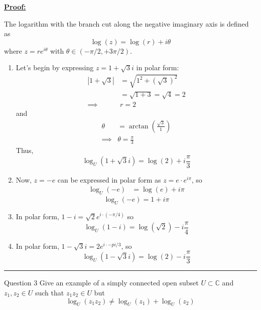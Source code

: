 \documentclass{article}
\newcommand{\C}{\mathbb{C}}
\begin{document}
\vskip 0.5cm
\underline{\textbf{Proof:}}

The logarithm with the branch cut along the negative imaginary axis is defined as \[ \log(z) = \log(r) + i\theta \] where $z = re^{i\theta}$ with $\theta \in \left(-\pi/2, +3\pi/2\right)$.

\vskip 0.5cm
\begin{enumerate}[label=(\alph*)]
  \item Let's begin by expressing $z = 1 + \sqrt{3}i$ in polar form:
  \begin{align*}
    |1 + \sqrt{3}| &= \sqrt{1^2 + \left(\sqrt{3}\right)^2} \\
    &= \sqrt{1 + 3} = \sqrt{4} = 2 \\
    \implies& r = 2
  \end{align*}
  and 
  \begin{align*}
    \theta &= \arctan\left(\frac{\sqrt{3}}{1}\right) \\
    \implies& \theta = \frac{\pi}{3}
  \end{align*}
  Thus,
  \[ \boxed{ \log_U\left(1 + \sqrt{3}i\right) = \log(2) + i\frac{\pi}{3}} \]

  \vskip 0.5cm
  \item Now, $z = -e$ can be expressed in polar form as $z = e \cdot e^{i \pi}$, so 
  \begin{align*}
    \log_U \left(-e\right) &= \log(e) + i\pi
  \end{align*}
  \[ \boxed{ \log_U \left(-e\right) =  1 + i\pi} \]

  \vskip 0.5cm
  \item In polar form, $1 - i = \sqrt{2} e^{i \cdot \left(-\pi/4\right)}$ so 
  \[ \boxed{ \log_U(1 - i) = \log\left(\sqrt{2}\right) - i \frac{\pi}{4} } \]

  \vskip 0.5cm
  \item In polar form, $1 - \sqrt{3}i = 2e^{i \cdot -pi/3}$, so 
  \[ \boxed{\log_U\left(1 - \sqrt{3}i\right) = \log(2) - i\frac{\pi}{3}} \]
\end{enumerate}

\vskip 0.5cm
\hrule 
\vskip 0.5cm


\begin{mathdefinitionbox}{Question 3}
\vskip 0.5cm
Give an example of a simply connected open subset $U \subset \C$ and $z_1, z_2 \in U$ such that $z_1 z_2 \in U$ but 
\[ \log_U\left(z_1 z_2\right) \neq \log_U \left(z_1\right) + \log_U \left(z_2\right) \]
\end{mathdefinitionbox}
\end{document}
